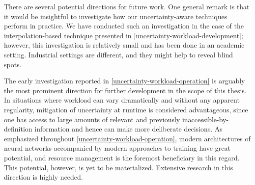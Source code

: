 There are several potential directions for future work. One general remark is
that it would be insightful to investigate how our uncertainty-aware techniques
perform in practice. We have conducted such an investigation in the case of the
interpolation-based technique presented in
\cref{uncertainty-workload-development}; however, this investigation is
relatively small and has been done in an academic setting. Industrial settings
are different, and they might help to reveal blind spots.

The early investigation reported in \cref{uncertainty-workload-operation} is
arguably the most prominent direction for further development in the scope of
this thesis. In situations where workload can vary dramatically and without any
apparent regularity, mitigation of uncertainty at runtime is considered
advantageous, since one has access to large amounts of relevant and previously
inaccessible-by-definition information and hence can make more deliberate
decisions. As emphasized throughout \cref{uncertainty-workload-operation},
modern architectures of neural networks accompanied by modern approaches to
training have great potential, and resource management is the foremost
beneficiary in this regard. This potential, however, is yet to be materialized.
Extensive research in this direction is highly needed.
